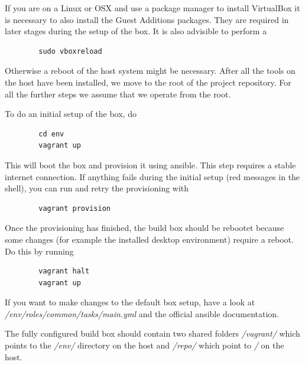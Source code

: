 If you are on a Linux or OSX and use a package manager to install VirtualBox it is necessary to also install the Guest Additions packages. They are required in later stages during the setup of the box.
It is also advisible to perform a

\begin{listing}
    \begin{verbatim}
        sudo vboxreload
    \end{verbatim}
\end{listing}

Otherwise a reboot of the host system might be necessary.
After all the tools on the host have been installed, we move to the root of the project repository. For all the further steps we assume that we operate from the root.

To do an initial setup of the box, do

\begin{listing}
    \begin{verbatim}
        cd env
        vagrant up
    \end{verbatim}
\end{listing}

This will boot the box and provision it using ansible. This step requires a stable internet connection. If anything fails during the initial setup (red messages in the shell), you can run and retry the provisioning with

\begin{listing}
    \begin{verbatim}
        vagrant provision
    \end{verbatim}
\end{listing}

Once the provisioning has finished, the build box should be rebootet because some changes (for example the installed desktop environment) require a reboot. Do this by running

\begin{listing}
    \begin{verbatim}
        vagrant halt
        vagrant up
    \end{verbatim}
\end{listing}

If you want to make changes to the default box setup, have a look at \textit{/env/roles/common/tasks/main.yml} and the official ansible\cite{TODO:} documentation.

The fully configured build box should contain two shared folders \textit{/vagrant/} which points to the \textit{/env/} directory on the host and \textit{/repo/} which point to \textit{/} on the host.

